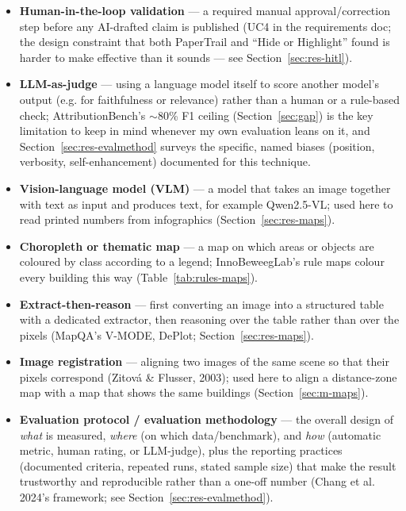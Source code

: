 \begin{itemize}
\item \textbf{Human-in-the-loop validation} — a required manual approval/correction step before any AI-drafted claim is published (UC4 in the requirements doc; the design constraint that both PaperTrail and \textquotedblleft{}Hide or Highlight\textquotedblright{} found is harder to make effective than it sounds — see Section~\ref{sec:res-hitl}).
\item \textbf{LLM-as-judge} — using a language model itself to score another model's output (e.g. for faithfulness or relevance) rather than a human or a rule-based check; AttributionBench's $\sim$80\% F1 ceiling (Section~\ref{sec:gap}) is the key limitation to keep in mind whenever my own evaluation leans on it, and Section~\ref{sec:res-evalmethod} surveys the specific, named biases (position, verbosity, self-enhancement) documented for this technique.
\item \textbf{Vision-language model (VLM)} — a model that takes an image together with text as input and produces text, for example Qwen2.5-VL; used here to read printed numbers from infographics (Section~\ref{sec:res-maps}).
\item \textbf{Choropleth or thematic map} — a map on which areas or objects are coloured by class according to a legend; InnoBeweegLab's rule maps colour every building this way (Table~\ref{tab:rules-maps}).
\item \textbf{Extract-then-reason} — first converting an image into a structured table with a dedicated extractor, then reasoning over the table rather than over the pixels (MapQA's V-MODE, DePlot; Section~\ref{sec:res-maps}).
\item \textbf{Image registration} — aligning two images of the same scene so that their pixels correspond (Zitov\'a \& Flusser, 2003); used here to align a distance-zone map with a map that shows the same buildings (Section~\ref{sec:m-maps}).
\item \textbf{Evaluation protocol / evaluation methodology} — the overall design of \textit{what} is measured, \textit{where} (on which data/benchmark), and \textit{how} (automatic metric, human rating, or LLM-judge), plus the reporting practices (documented criteria, repeated runs, stated sample size) that make the result trustworthy and reproducible rather than a one-off number (Chang et al. 2024's framework; see Section~\ref{sec:res-evalmethod}).
\end{itemize}
